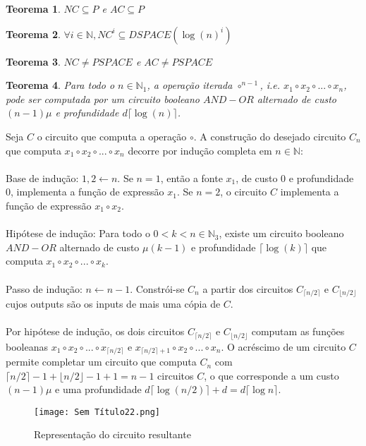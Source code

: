 \documentclass[10pt,a4paper]{report}
\newtheorem{theorem}{Teorema}
\begin{document}
\begin{theorem}
$NC \subseteq P$ e $AC \subseteq P$
\end{theorem}
\begin{theorem}
$\forall i \in \mathbb{N}, NC^i \subseteq DSPACE (\log(n)^i)$
\end{theorem}
\begin{theorem}
$NC \neq PSPACE$ e $AC \neq PSPACE$
\end{theorem}
\begin{theorem}
Para todo o $n \in \mathbb{N}_1$, a operação iterada $\circ^{n-1}$, i.e. $x_1 \circ x_2 \circ ... \circ x_n$, pode ser computada por um circuito booleano $AND-OR$ alternado de custo $(n - 1)\mu$ e profundidade $d\lceil \log (n)\rceil$.
\end{theorem}
Seja $C$ o circuito que computa a operação $\circ$. A construção do desejado circuito $C_n$ que computa $x_1 \circ x_2 \circ ... \circ x_n$ decorre por indução completa em $n \in \mathbb{N}$:\\
\\
Base de indução: $1, 2 \leftarrow n$. Se $n = 1$, então a fonte $x_1$, de custo 0 e profundidade 0, implementa a função de expressão $x_1$. Se $n = 2$, o circuito $C$ implementa a função de expressão $x_1 \circ x_2$.\\
\\
Hipótese de indução: Para todo o $0 < k < n \in \mathbb{N}_3$, existe um circuito booleano $AND-OR$ alternado de custo $\mu(k - 1)$ e profundidade $\lceil\log (k)\rceil$ que computa $x_1 \circ x_2 \circ ... \circ x_k$.\\
\\
Passo de indução: $n \leftarrow n - 1$. Constrói-se $C_n$ a partir dos circuitos $C_{\lceil n/2 \rceil}$ e $C_{\lfloor n/2 \rfloor}$ cujos outputs são os inputs de mais uma cópia de $C$.\\
\\
Por hipótese de indução, os dois circuitos $C_{\lceil n/2 \rceil}$ e $C_{\lfloor n/2 \rfloor}$ computam as funções booleanas $x_1 \circ x_2 \circ ... \circ x_{\lceil n/2 \rceil}$ e $x_{\lceil n/2 \rceil + 1} \circ x_2 \circ ... \circ x_n$. O acréscimo de um circuito $C$ permite completar um circuito que computa $C_n$ com $\lceil n/2 \rceil -1+ \lfloor n/2 \rfloor -1+1 = n-1$ circuitos $C$, o que corresponde a um custo $(n-1)\mu$ e uma profundidade $d\lceil \log (n/2)\rceil + d = d\lceil \log n\rceil$.
\begin{figure}[H]
\centering
\texttt{[image: Sem Título22.png]}
\caption{Representação do circuito resultante}
\end{figure}
\end{document}
